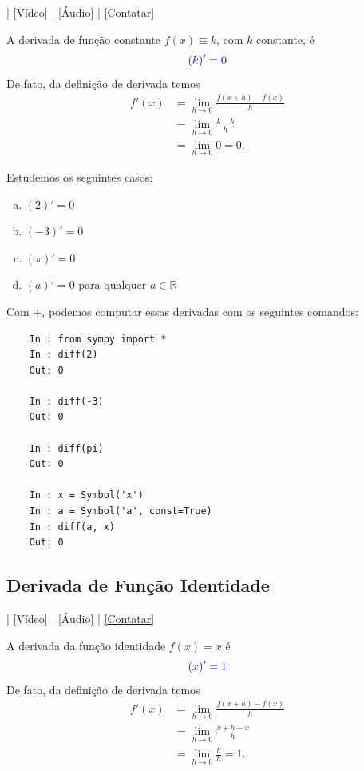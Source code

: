 \begin{flushright}
  [YouTube] | [Vídeo] | [Áudio] | \href{https://phkonzen.github.io/notas/contato.html}{[Contatar]}
\end{flushright}

A derivada de função constante $f(x) \equiv k$, com $k$ constante, é
\begin{equation}
  {\color{blue}(k)' = 0}
\end{equation}
De fato, da definição de derivada temos
\begin{align}
  f'(x) &= \lim_{h\to 0} \frac{f(x+h)-f(x)}{h}\\
        &= \lim_{h\to 0} \frac{k-k}{h} \\
        &= \lim_{h\to 0} 0 = 0.
\end{align}

\begin{ex}
  Estudemos os seguintes casos:
  \begin{enumerate}[a)]
  \item $(2)' = 0$
  \item $(-3)' = 0$
  \item $(\pi)' = 0$
  \item $(a)' = 0$ para qualquer $a\in\mathbb{R}$
  \end{enumerate}
  \ifispython
  Com {\python}+{\sympy}, podemos computar essas derivadas com os seguintes comandos:
  \begin{lstlisting}
    In : from sympy import *
    In : diff(2)
    Out: 0
    
    In : diff(-3)
    Out: 0

    In : diff(pi)
    Out: 0

    In : x = Symbol('x')
    In : a = Symbol('a', const=True)
    In : diff(a, x)
    Out: 0
  \end{lstlisting}
  \fi
\end{ex}

\subsection{Derivada de Função Identidade}

\begin{flushright}
  [YouTube] | [Vídeo] | [Áudio] | \href{https://phkonzen.github.io/notas/contato.html}{[Contatar]}
\end{flushright}

A derivada da função identidade $f(x) = x$ é
\begin{equation}
  {\color{blue}(x)' = 1}
\end{equation}
De fato, da definição de derivada temos
\begin{align}
  f'(x) &= \lim_{h\to 0} \frac{f(x+h)-f(x)}{h}\\
        &= \lim_{h\to 0} \frac{x+h-x}{h}\\
        &= \lim_{h\to 0} \frac{h}{h} = 1.\\
\end{align}

